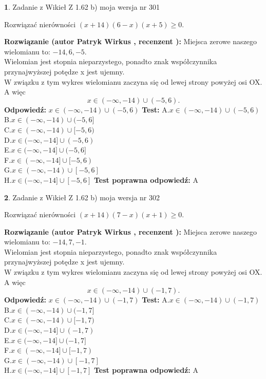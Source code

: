 \documentclass[12pt, a4paper]{article}
\theoremstyle{definition} %
\newtheorem{zad}{}
\newcommand{\zadStart}[1]{\begin{zad}#1\newline}
\newcommand{\zadStop}{\end{zad}}
\newcommand{\rozwStart}[2]{\noindent \textbf{Rozwiązanie (autor #1 , recenzent #2): }\newline}
\newcommand{\rozwStop}{\newline}
\newcommand{\odpStart}{\noindent \textbf{Odpowiedź:}\newline}
\newcommand{\odpStop}{\newline}
\newcommand{\testStart}{\noindent \textbf{Test:}\newline}
\newcommand{\testStop}{\newline}
\newcommand{\kluczStart}{\noindent \textbf{Test poprawna odpowiedź:}\newline}
\newcommand{\kluczStop}{\newline}
\begin{document}
\zadStart{Zadanie z Wikieł Z 1.62 b) moja wersja nr 301}

Rozwiązać nierówności $(x+14)(6-x)(x+5)\ge0$.
\zadStop
\rozwStart{Patryk Wirkus}{}
Miejsca zerowe naszego wielomianu to: $-14, 6, -5$.\\
Wielomian jest stopnia nieparzystego, ponadto znak współczynnika przy\linebreak najwyższej potędze x jest ujemny.\\ W związku z tym wykres wielomianu zaczyna się od lewej strony powyżej osi OX. A więc $$x \in (-\infty,-14) \cup (-5,6).$$
\rozwStop
\odpStart
$x \in (-\infty,-14) \cup (-5,6)$
\odpStop
\testStart
A.$x \in (-\infty,-14) \cup (-5,6)$\\
B.$x \in (-\infty,-14) \cup (-5,6]$\\
C.$x \in (-\infty,-14) \cup [-5,6)$\\
D.$x \in (-\infty,-14] \cup (-5,6)$\\
E.$x \in (-\infty,-14] \cup (-5,6]$\\
F.$x \in (-\infty,-14] \cup [-5,6)$\\
G.$x \in (-\infty,-14) \cup [-5,6]$\\
H.$x \in (-\infty,-14] \cup [-5,6]$
\testStop
\kluczStart
A
\kluczStop



\zadStart{Zadanie z Wikieł Z 1.62 b) moja wersja nr 302}

Rozwiązać nierówności $(x+14)(7-x)(x+1)\ge0$.
\zadStop
\rozwStart{Patryk Wirkus}{}
Miejsca zerowe naszego wielomianu to: $-14, 7, -1$.\\
Wielomian jest stopnia nieparzystego, ponadto znak współczynnika przy\linebreak najwyższej potędze x jest ujemny.\\ W związku z tym wykres wielomianu zaczyna się od lewej strony powyżej osi OX. A więc $$x \in (-\infty,-14) \cup (-1,7).$$
\rozwStop
\odpStart
$x \in (-\infty,-14) \cup (-1,7)$
\odpStop
\testStart
A.$x \in (-\infty,-14) \cup (-1,7)$\\
B.$x \in (-\infty,-14) \cup (-1,7]$\\
C.$x \in (-\infty,-14) \cup [-1,7)$\\
D.$x \in (-\infty,-14] \cup (-1,7)$\\
E.$x \in (-\infty,-14] \cup (-1,7]$\\
F.$x \in (-\infty,-14] \cup [-1,7)$\\
G.$x \in (-\infty,-14) \cup [-1,7]$\\
H.$x \in (-\infty,-14] \cup [-1,7]$
\testStop
\kluczStart
A
\kluczStop
\end{document}
